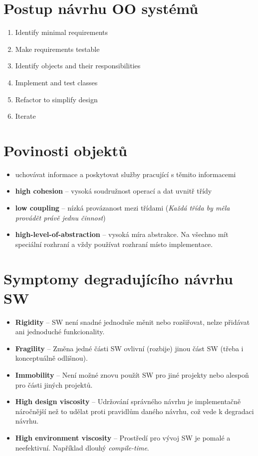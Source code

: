 \documentclass{szzclass}
\begin{document}
\tableofcontents
\newpage

\section{Postup návrhu OO systémů}

\begin{enumerate}
      \item Identify minimal requirements
      \item Make requirements testable
      \item Identify objects and their responsibilities
      \item Implement and test classes
      \item Refactor to simplify design
      \item Iterate
\end{enumerate}

\section{Povinosti objektů}

\begin{itemize}
      \item uchovávat informace a poskytovat služby pracující s těmito informacemi
      \item \textbf{high cohesion} -- vysoká soudružnost operací a dat uvnitř třídy
      \item \textbf{low coupling} -- nízká provázanost mezi třídami
      (\textit{Každá třída by měla provádět právě jednu činnost})
      \item \textbf{high-level-of-abstraction} -- vysoká míra abstrakce.
      Na všechno mít speciální rozhraní a vždy používat rozhraní místo implementace.
\end{itemize}


\section{Symptomy degradujícího návrhu SW}

\begin{itemize}
      \item \textbf{Rigidity} -- SW není snadné jednoduše měnit nebo rozšiřovat,
      nelze přidávat ani jednoduché funkcionality.
      \item \textbf{Fragility} -- Změna jedné části SW ovlivní (rozbije) jinou
      část SW (třeba i konceptuálně odlišnou).
      \item \textbf{Immobility} -- Není možné znovu použít SW pro jiné projekty
      nebo alespoň pro části jiných projektů.
      \item \textbf{High design viscosity} -- Udržování správného návrhu je implementačně náročnější
      než to udělat proti pravidlům daného návrhu, což vede k degradaci návrhu.
      \item \textbf{High environment viscosity} -- Prostředí pro vývoj SW je pomalé a neefektivní.
      Například dlouhý \textit{compile-time}.
\end{itemize}
\end{document}
